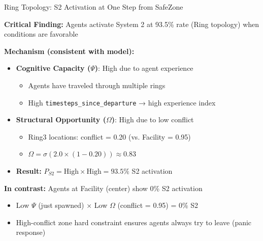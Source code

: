 \documentclass[aspectratio=169]{beamer}
\begin{document}
\begin{frame}{Ring Topology: S2 Activation at One Step from SafeZone}

\textbf{Critical Finding:} Agents activate System 2 at 93.5\% rate (Ring topology) when conditions are favorable

\vspace{0.5em}

\textbf{Mechanism (consistent with model):}
\begin{itemize}
    \item \textbf{Cognitive Capacity ($\Psi$)}: High due to agent experience
    \begin{itemize}
        \item Agents have traveled through multiple rings
        \item High \texttt{timesteps\_since\_departure} → high experience index
    \end{itemize}
    \item \textbf{Structural Opportunity ($\Omega$)}: High due to low conflict
    \begin{itemize}
        \item Ring3 locations: conflict = 0.20 (vs. Facility = 0.95)
        \item $\Omega = \sigma(2.0 \times (1 - 0.20)) \approx 0.83$
    \end{itemize}
    \item \textbf{Result:} $P_{S2} = \text{High} \times \text{High} = 93.5\%$ S2 activation
\end{itemize}

\vspace{0.5em}

\textbf{In contrast:} Agents at Facility (center) show 0\% S2 activation
\begin{itemize}
    \item Low $\Psi$ (just spawned) × Low $\Omega$ (conflict = 0.95) = 0\% S2
    \item High-conflict zone hard constraint ensures agents always try to leave (panic response)
\end{itemize}

\end{frame}
\end{document}
